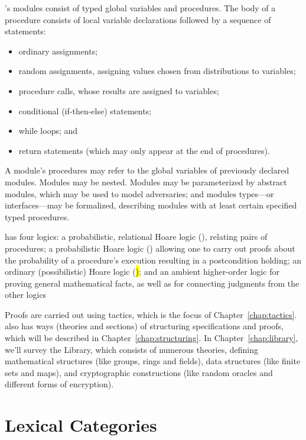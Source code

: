 \EasyCrypt's modules consist of typed global variables and procedures.
The body of a procedure consists of local variable declarations followed
by a sequence of statements:
\begin{itemize}
\item ordinary assignments;

\item random assignments, assigning values chosen
  from distributions to variables;

\item procedure calls, whose results are assigned to variables;

\item conditional (if-then-else) statements;

\item while loops; and

\item return statements (which may only appear at the end of
  procedures).
\end{itemize}
A module's procedures may refer to the global variables of previously
declared modules. Modules may be nested.  Modules may be parameterized
by abstract modules, which may be used to model adversaries; and
modules types---or interfaces---may be formalized, describing modules
with at least certain specified typed procedures.

\EasyCrypt has four logics: a probabilistic, relational Hoare logic
(\prhl), relating pairs of procedures; a probabilistic Hoare logic
(\phl) allowing one to carry out proofs about the probability of a
procedure's execution resulting in a postcondition holding; an
ordinary (possibilistic) Hoare logic (\hl); and an ambient
higher-order logic for proving general mathematical facts, as well as
for connecting judgments from the other logics

Proofs are carried out using tactics, which is the focus of
Chapter~\ref{chap:tactics}.  \EasyCrypt also has ways (theories and
sections) of structuring specifications and proofs, which will be
described in Chapter~\ref{chap:structuring}. In Chapter~\ref{chap:library},
we'll survey the \EasyCrypt Library, which consists of numerous
theories, defining mathematical structures (like groups, rings
and fields), data structures (like finite sets and maps), and
cryptographic constructions (like random oracles and different
forms of encryption).

\section{Lexical Categories}
\label{sec:lexical}

